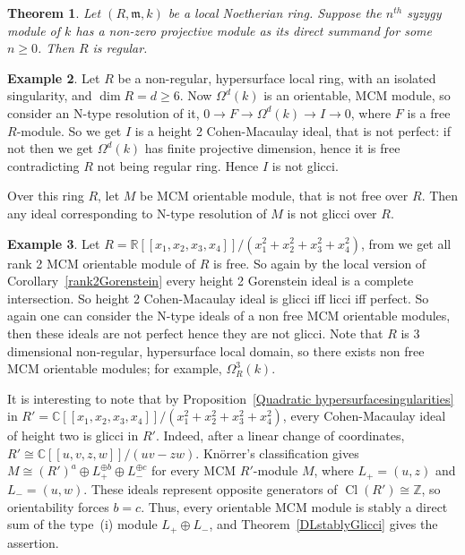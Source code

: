 \documentclass[11pt,letterpaper]{amsart}
\newcommand{\x}{\xrightarrow{}}
\theoremstyle{plain}
\newtheorem{thm}{Theorem}[section]
\theoremstyle{definition}
\newtheorem{ex}[thm]{Example}
\theoremstyle{remark}
\begin{document}
\begin{thm}\cite[Corollary~1.3]{dutta1989syzygies}\label{dutta} Let $(R,\mathfrak m, k)$ be a local Noetherian ring. Suppose the $n^{th}$ syzygy module of $k$ has a non-zero projective module as its direct summand for some
$n\ge 0$. Then $R$ is regular.
\end{thm}

\begin{ex}\label{isolatedsingularityexample}
     Let $R$ be a non-regular, hypersurface local ring, with an isolated singularity, and $\dim R=d\ge 6$. Now $\Omega^d(k)$ is an orientable, MCM module, so consider an N-type resolution of it, $0\x F\x \Omega^d(k)\x I\x 0$, where $F$ is a free $R$-module. So we get $I$ is a height 2 Cohen-Macaulay ideal, that is not perfect: if not then we get $\Omega^d(k)$ has finite projective dimension, hence it is free contradicting $R$ not being regular ring. Hence $I$ is not glicci.

    Over this ring $R$,  let $M$ be MCM orientable module, that is not free over $R$. Then any  ideal corresponding to N-type resolution of $M$ is not glicci over $R$.
\end{ex}

\begin{ex}
    Let $R=\mathbb{R}[[x_1,x_2,x_3,x_4]]/(x_1^2+x_2^2+x_3^2+x_4^2)$, from \cite[Example~3.3]{herzog1987maximal} we get all rank 2 MCM orientable module of $R$ is free. So again by the local version of Corollary~\ref{rank2Gorenstein} every height 2 Gorenstein ideal is a complete intersection. So height 2 Cohen-Macaulay ideal is glicci iff licci iff perfect. So again one can consider the N-type ideals of a non free MCM orientable modules, then these ideals are not perfect hence they are not glicci. Note that $R$ is 3 dimensional non-regular, hypersurface local domain, so there exists non free MCM orientable modules; for example, $\Omega^3_R(k)$. 
\end{ex}

It is interesting to note that by Proposition~\ref{Quadratic hypersurfacesingularities} in $R'=\mathbb{C}[[x_1,x_2,x_3,x_4]]/(x_1^2+x_2^2+x_3^2+x_4^2)$, every Cohen-Macaulay ideal of height two is glicci in $R'$. Indeed, after a linear change of coordinates,
\(R'\cong\mathbb C[[u,v,z,w]]/(uv-zw)\).
Kn\"orrer's classification gives
\(M\cong(R')^a\oplus L_+^{\oplus b}\oplus L_-^{\oplus c}\)
for every MCM \(R'\)-module \(M\), where \(L_+=(u,z)\) and \(L_-=(u,w)\).
These ideals represent opposite generators of
\(\operatorname{Cl}(R')\cong\mathbb Z\), so orientability forces \(b=c\).
Thus, every orientable MCM module is stably a direct sum of the
type~(i) module \(L_+\oplus L_-\), and Theorem~\ref{DLstablyGlicci} gives the assertion.
\end{document}
